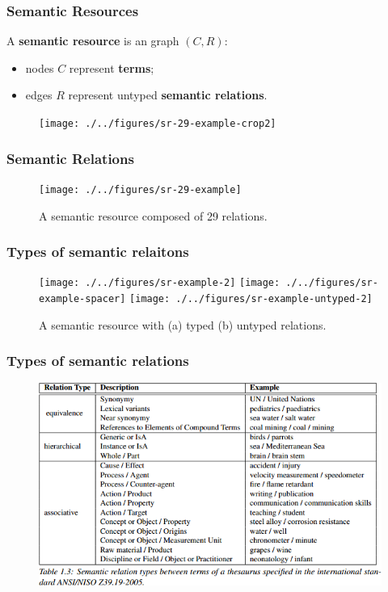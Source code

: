 \begin{frame}
\frametitle{Semantic Resources}

\begin{block}{}

A \textbf{semantic resource} is an graph $(C, R)$:
\begin{itemize}
\item nodes $C$ represent \textbf{terms};
\item edges $R$ represent untyped \textbf{semantic relations}.
\end{itemize}

\end{block}

\begin{figure}
\centering
\texttt{[image: ./../figures/sr-29-example-crop2]}
\end{figure}

\end{frame}




\begin{frame}
\frametitle{Semantic Relations}
\begin{figure}
\centering
\texttt{[image: ./../figures/sr-29-example]}
\caption{A semantic resource composed of 29 relations.}
\end{figure}

\end{frame}





\begin{frame}
\frametitle{Types of semantic relaitons}

\begin{figure}
\centering
\texttt{[image: ./../figures/sr-example-2]}
\texttt{[image: ./../figures/sr-example-spacer]}
\texttt{[image: ./../figures/sr-example-untyped-2]}
\caption{A semantic resource with (a) typed (b) untyped relations. }
\end{figure}

\end{frame}



\begin{frame}
\frametitle{Types of semantic relations}

\begin{figure}
\centering
\includegraphics[height=0.49\textwidth]{./figures/sem-types}
\end{figure}

\end{frame}





